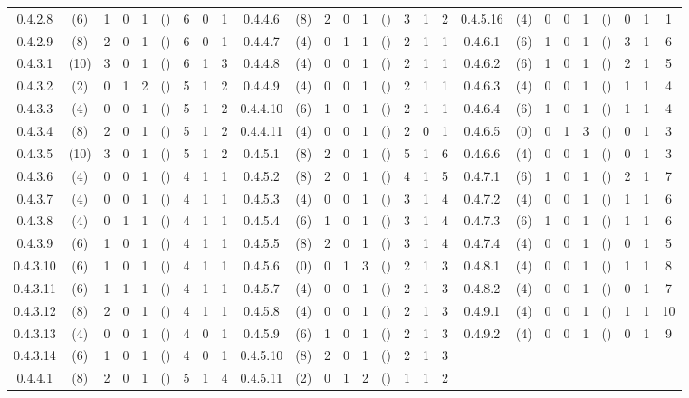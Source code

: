 {\begin{longtable}{ccccccccc|ccccccccc|ccccccccc}
\rowcolor{lightgray}
0.4.2.8 & (6) & 1 & 0 & 1 & () & 6 & 0 & 1 & 0.4.4.6 & (8) & 2 & 0 & 1 & () & 3 & 1 & 2 & 0.4.5.16 & (4) & 0 & 0 & 1 & () & 0 & 1 & 1\\
0.4.2.9 & (8) & 2 & 0 & 1 & () & 6 & 0 & 1 & 0.4.4.7 & (4) & 0 & 1 & 1 & () & 2 & 1 & 1 & 0.4.6.1 & (6) & 1 & 0 & 1 & () & 3 & 1 & 6\\
\rowcolor{lightgray}
0.4.3.1 & (10) & 3 & 0 & 1 & () & 6 & 1 & 3 & 0.4.4.8 & (4) & 0 & 0 & 1 & () & 2 & 1 & 1 & 0.4.6.2 & (6) & 1 & 0 & 1 & () & 2 & 1 & 5\\
0.4.3.2 & (2) & 0 & 1 & 2 & () & 5 & 1 & 2 & 0.4.4.9 & (4) & 0 & 0 & 1 & () & 2 & 1 & 1 & 0.4.6.3 & (4) & 0 & 0 & 1 & () & 1 & 1 & 4\\
\rowcolor{lightgray}
0.4.3.3 & (4) & 0 & 0 & 1 & () & 5 & 1 & 2 & 0.4.4.10 & (6) & 1 & 0 & 1 & () & 2 & 1 & 1 & 0.4.6.4 & (6) & 1 & 0 & 1 & () & 1 & 1 & 4\\
0.4.3.4 & (8) & 2 & 0 & 1 & () & 5 & 1 & 2 & 0.4.4.11 & (4) & 0 & 0 & 1 & () & 2 & 0 & 1 & 0.4.6.5 & (0) & 0 & 1 & 3 & () & 0 & 1 & 3\\
\rowcolor{lightgray}
0.4.3.5 & (10) & 3 & 0 & 1 & () & 5 & 1 & 2 & 0.4.5.1 & (8) & 2 & 0 & 1 & () & 5 & 1 & 6 & 0.4.6.6 & (4) & 0 & 0 & 1 & () & 0 & 1 & 3\\
0.4.3.6 & (4) & 0 & 0 & 1 & () & 4 & 1 & 1 & 0.4.5.2 & (8) & 2 & 0 & 1 & () & 4 & 1 & 5 & 0.4.7.1 & (6) & 1 & 0 & 1 & () & 2 & 1 & 7\\
\rowcolor{lightgray}
0.4.3.7 & (4) & 0 & 0 & 1 & () & 4 & 1 & 1 & 0.4.5.3 & (4) & 0 & 0 & 1 & () & 3 & 1 & 4 & 0.4.7.2 & (4) & 0 & 0 & 1 & () & 1 & 1 & 6\\
0.4.3.8 & (4) & 0 & 1 & 1 & () & 4 & 1 & 1 & 0.4.5.4 & (6) & 1 & 0 & 1 & () & 3 & 1 & 4 & 0.4.7.3 & (6) & 1 & 0 & 1 & () & 1 & 1 & 6\\
\rowcolor{lightgray}
0.4.3.9 & (6) & 1 & 0 & 1 & () & 4 & 1 & 1 & 0.4.5.5 & (8) & 2 & 0 & 1 & () & 3 & 1 & 4 & 0.4.7.4 & (4) & 0 & 0 & 1 & () & 0 & 1 & 5\\
0.4.3.10 & (6) & 1 & 0 & 1 & () & 4 & 1 & 1 & 0.4.5.6 & (0) & 0 & 1 & 3 & () & 2 & 1 & 3 & 0.4.8.1 & (4) & 0 & 0 & 1 & () & 1 & 1 & 8\\
\rowcolor{lightgray}
0.4.3.11 & (6) & 1 & 1 & 1 & () & 4 & 1 & 1 & 0.4.5.7 & (4) & 0 & 0 & 1 & () & 2 & 1 & 3 & 0.4.8.2 & (4) & 0 & 0 & 1 & () & 0 & 1 & 7\\
0.4.3.12 & (8) & 2 & 0 & 1 & () & 4 & 1 & 1 & 0.4.5.8 & (4) & 0 & 0 & 1 & () & 2 & 1 & 3 & 0.4.9.1 & (4) & 0 & 0 & 1 & () & 1 & 1 & 10\\
\rowcolor{lightgray}
0.4.3.13 & (4) & 0 & 0 & 1 & () & 4 & 0 & 1 & 0.4.5.9 & (6) & 1 & 0 & 1 & () & 2 & 1 & 3 & 0.4.9.2 & (4) & 0 & 0 & 1 & () & 0 & 1 & 9\\
  0.4.3.14 & (6) & 1 & 0 & 1 & () & 4 & 0 & 1 & 0.4.5.10 & (8) & 2 & 0 & 1 & () & 2 & 1 & 3 & & & & & & & & & \\
\rowcolor{lightgray}
  0.4.4.1 & (8) & 2 & 0 & 1 & () & 5 & 1 & 4 & 0.4.5.11 & (2) & 0 & 1 & 2 & () & 1 & 1 & 2 & & & & & & & & & \\
\hline\end{longtable}
}
